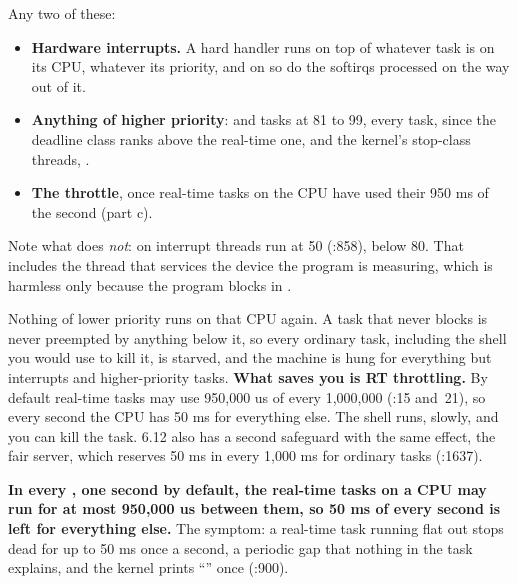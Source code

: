 
 Any two of these:
\begin{itemize}
  \item \textbf{Hardware interrupts.} A hard handler runs on top of whatever task is on its CPU,
    whatever its priority, and on  so do the softirqs processed on the way out of it.
  \item \textbf{Anything of higher priority}:  and  tasks at 81 to
    99, every  task, since the deadline class ranks above the real-time one,
    and the kernel's stop-class threads, .
  \item \textbf{The throttle}, once real-time tasks on the CPU have used their 950 ms of the second
    (part c).
\end{itemize}
Note what does \emph{not}: on  interrupt threads run at  50
(:858), below 80. That includes the thread that services the device
the program is measuring, which is harmless only because the program blocks in .

 Nothing of lower priority runs on that CPU again. A  task that never
blocks is never preempted by anything below it, so every ordinary task, including the shell you
would use to kill it, is starved, and the machine is hung for everything but interrupts and
higher-priority tasks. \textbf{What saves you is RT throttling.} By default real-time tasks may use
950,000 us of every 1,000,000 (:15 and~21), so every second the CPU has
50 ms for everything else. The shell runs, slowly, and you can kill the task. 6.12 also has a
second safeguard with the same effect, the fair server, which reserves 50 ms in every 1,000 ms for
ordinary tasks (:1637).

 \textbf{In every , one second by default, the real-time tasks on
a CPU may run for at most 950,000 us between them, so 50 ms of every second is left for everything
else.} The symptom: a real-time task running flat out stops dead for up to 50 ms once a second, a
periodic gap that nothing in the task explains, and the kernel prints ``'' once (:900).

